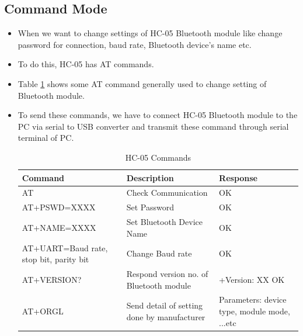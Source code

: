 \documentclass[12pt, a4paper, twoside]{report}
\begin{document}
\subsection{Command Mode}
\begin{itemize}
\item When we want to change settings of HC-05 Bluetooth module like change password for connection, baud rate, Bluetooth device’s name etc.
\item To do this, HC-05 has AT commands.
\item Table \ref{tab:hc-commands} shows some AT command generally used to change setting of Bluetooth module.
\item To send these commands, we have to connect HC-05 Bluetooth module to the PC via serial to USB converter and transmit these command through serial terminal of PC.
\begin{table}[]
\centering
\begin{tabular}{|p{}|p{}|p{}|}
\hline
\textbf{Command}                        & \textbf{Description}                        & \textbf{Response}                            \\ \hline
AT                                      & Check Communication                         & OK                                           \\ \hline
AT+PSWD=XXXX                            & Set Password                                & OK                                           \\ \hline
AT+NAME=XXXX                            & Set Bluetooth Device Name                   & OK                                           \\ \hline
AT+UART=Baud rate, stop bit, parity bit & Change Baud rate                            & OK                                           \\ \hline
AT+VERSION?                             & Respond version no. of Bluetooth module     & +Version: XX OK                              \\ \hline
AT+ORGL                                 & Send detail of setting done by manufacturer & Parameters: device type, module mode, ...etc \\ \hline
\end{tabular}
\caption{HC-05 Commands}
\label{tab:hc-commands}
\end{table}
\end{itemize}
\end{document}
